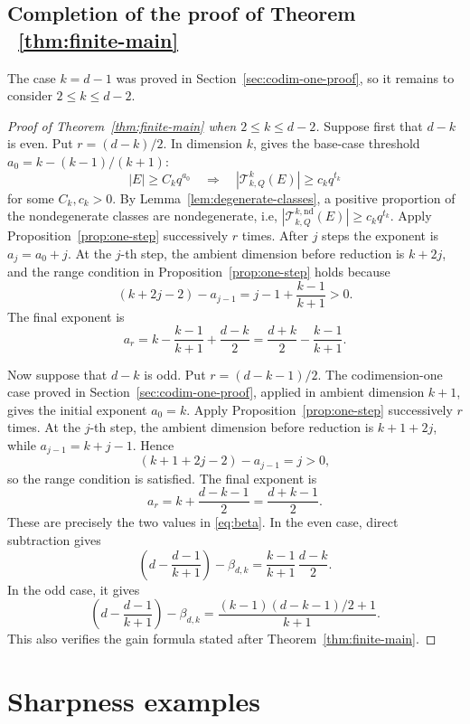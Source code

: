 \documentclass[11pt]{article}
\theoremstyle{remark}
\numberwithin{equation}{section}
\newcommand{\cT}{\mathcal T}
\newcommand{\1}{\mathbf 1}
\begin{document}
\subsection{Completion of the proof of Theorem ~\ref{thm:finite-main}}

The case \(k=d-1\) was proved in Section~\ref{sec:codim-one-proof}, so it remains to consider \(2\le k\le d-2\).

\begin{proof}[Proof of Theorem~\ref{thm:finite-main} when $2\leq k\leq d-2$]

Suppose first that \(d-k\) is even. Put $r=(d-k)/2$. In dimension \(k\), \cite[Theorem 1.5]{BHIPR} gives the base-case threshold $a_0=k-(k-1)/(k+1)$:
\[
|E|\geq C_k q^{a_0} \quad\Longrightarrow\quad
 |\cT^{k}_{k,Q}(E)|
 \geq c_k q^{t_k}
\]
for some $C_k,c_k>0$. By Lemma~\ref{lem:degenerate-classes}, a positive proportion of the nondegenerate classes are nondegenerate, i.e, $|\cT^{k,\mathrm{nd}}_{k,Q}(E)|
 \geq c_k q^{t_k}$. Apply Proposition~\ref{prop:one-step} successively \(r\) times. After \(j\)
steps the exponent is \(a_j=a_0+j\). At the \(j\)-th step, the ambient dimension before reduction is \(k+2j\), and the range condition in Proposition~\ref{prop:one-step} holds because
\[
 (k+2j-2)-a_{j-1} = j-1+\frac{k-1}{k+1}>0.
\]
The final exponent is
\[
 a_r =  k-\frac{k-1}{k+1}+\frac{d-k}{2}  = \frac{d+k}{2}-\frac{k-1}{k+1}.
\]

Now suppose that \(d-k\) is odd. Put $r=(d-k-1)/2$. The codimension-one case proved in Section~\ref{sec:codim-one-proof}, applied in ambient dimension \(k+1\), gives the initial exponent $a_0=k$. Apply Proposition~\ref{prop:one-step} successively \(r\) times. At the \(j\)-th step, the ambient dimension before reduction is \(k+1+2j\), while \(a_{j-1}=k+j-1\). Hence
\[
 (k+1+2j-2)-a_{j-1}=j>0,
\]
so the range condition is satisfied. The final exponent is
\[
a_r  = k+\frac{d-k-1}{2} = \frac{d+k-1}{2}.
\]
These are precisely the two values in \eqref{eq:beta}. In the even case, direct subtraction gives
\[
\left(d-\frac{d-1}{k+1}\right)-\beta_{d,k} = \frac{k-1}{k+1}\,\frac{d-k}{2}.
\]
In the odd case, it gives
\[
\left(d-\frac{d-1}{k+1}\right)-\beta_{d,k} = \frac{(k-1)(d-k-1)/2+1}{k+1}.
\]
This also verifies the gain formula stated after Theorem~\ref{thm:finite-main}.
\end{proof}

\section{Sharpness examples}\label{sec:sharpness}
\end{document}
